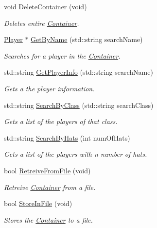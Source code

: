 \begin{DoxyCompactItemize}
void \hyperlink{class_container_ae840ec5b490033434a9af64722286e1b}{Delete\+Container} (void)
\begin{DoxyCompactList}\small\item\em Deletes entire \hyperlink{class_container}{Container}. \end{DoxyCompactList}\item 
\hyperlink{class_player}{Player} $\ast$ \hyperlink{class_container_a587a1d670dc5b27e39956463acce3b4f}{Get\+By\+Name} (std\+::string search\+Name)
\begin{DoxyCompactList}\small\item\em Searches for a player in the \hyperlink{class_container}{Container}. \end{DoxyCompactList}\item 
std\+::string \hyperlink{class_container_ad3c15a0dbb0a718322c1347676dc62ac}{Get\+Player\+Info} (std\+::string search\+Name)
\begin{DoxyCompactList}\small\item\em Gets a the player information. \end{DoxyCompactList}\item 
std\+::string \hyperlink{class_container_a136a4e9bbd1b018e6572fb5ac4f2e133}{Search\+By\+Class} (std\+::string search\+Class)
\begin{DoxyCompactList}\small\item\em Gets a list of the players of that class. \end{DoxyCompactList}\item 
std\+::string \hyperlink{class_container_ae84b8946992689f0da2278719cbe9fb1}{Search\+By\+Hats} (int num\+Of\+Hats)
\begin{DoxyCompactList}\small\item\em Gets a list of the players with n number of hats. \end{DoxyCompactList}\item 
bool \hyperlink{class_container_a5a41ee2f12b10f834bcf3814dfcb7e77}{Retreive\+From\+File} (void)
\begin{DoxyCompactList}\small\item\em Retreive \hyperlink{class_container}{Container} from a file. \end{DoxyCompactList}\item 
bool \hyperlink{class_container_a3fbf493b69d0fdb0428ba9fd4384a1ae}{Store\+In\+File} (void)
\begin{DoxyCompactList}\small\item\em Stores the \hyperlink{class_container}{Container} to a file. \end{DoxyCompactList}\item 

\end{DoxyCompactItemize}
